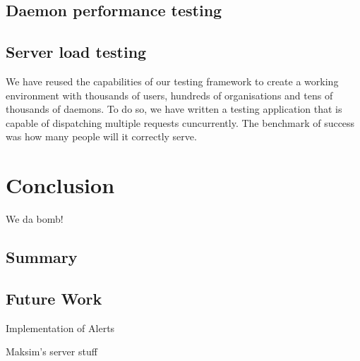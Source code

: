 \documentclass{l3proj}
\begin{document}
\section{Daemon performance testing}


\section{Server load testing}

We have reused the capabilities of our testing framework to create a working environment with thousands of users, hundreds of organisations and tens of thousands of daemons. To do so, we have written a testing application that is capable of dispatching multiple requests cuncurrently. The benchmark of success was how many people will it correctly serve.



\chapter{Conclusion}

We da bomb!


\section{Summary}


\section{Future Work}

Implementation of Alerts

Maksim's server stuff
\end{document}
